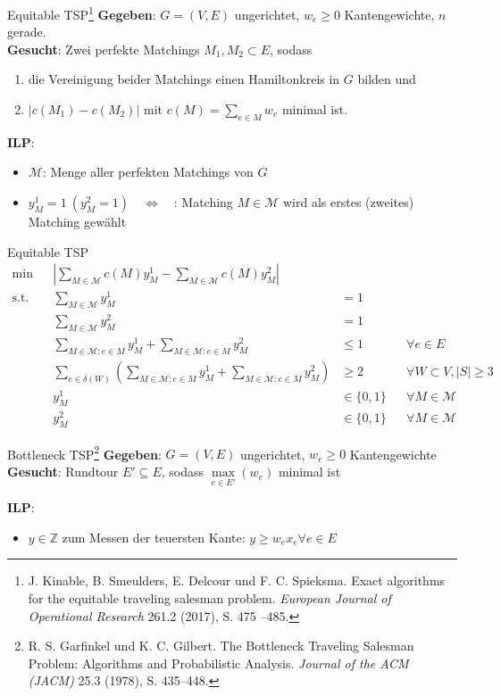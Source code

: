 \documentclass[ngerman,aspectratio=169,10pt]{beamer}
\begin{document}
\begin{frame}{Equitable TSP\footnote{J. Kinable, B. Smeulders, E. Delcour und F. C. Spieksma. Exact algorithms for the equitable traveling salesman problem. \emph{European Journal of Operational Research} 261.2 (2017), S. 475 –485.}}
	\textbf{Gegeben}: $G=(V,E)$ ungerichtet, $w_e\geq0$ Kantengewichte, $n$ gerade.\\
	\textbf{Gesucht}: Zwei perfekte Matchings $M_1,M_2\subset E$, sodass
	\begin{enumerate}
		\item die Vereinigung beider Matchings einen Hamiltonkreis in $G$ bilden und
		\item $|c(M_1)-c(M_2)|$ mit $c(M)=\sum_{e\in M}w_e$ minimal ist.
	\end{enumerate}

	\textbf{ILP}:
	\begin{itemize}
		\item $\mathcal{M}$: Menge aller perfekten Matchings von $G$
		\item $y_M^1=1~(y_M^2=1)\quad\Leftrightarrow\quad$: Matching $M\in\mathcal{M}$ wird als erstes (zweites) Matching gewählt
	\end{itemize}

	
\end{frame}
\begin{frame}{Equitable TSP}
   \begin{align*}
   \min    && \left|\sum_{M\in\mathcal{M}}c(M)y_M^1-\sum_{M\in\mathcal{M}}c(M)y_M^2\right|\\
   \text{s.t.} && \sum_{M\in\mathcal{M}}y_M^1 &=1&&\\
   && \sum_{M\in\mathcal{M}}y_M^2 &=1&&\\
   && \sum_{M\in\mathcal{M}:e\in M}y_M^1+\sum_{M\in\mathcal{M}:e\in M}y_M^2 &\leq1 &&\forall e\in E\\
   && \sum_{e\in\delta(W)}\left(\sum_{M\in\mathcal{M}:e\in M}y_M^1+\sum_{M\in\mathcal{M}:e\in M}y_M^2\right) &\geq 2 &&\forall W\subset V, |S| \geq 3\\
   && y_M^1 &\in\{0,1\} &&\forall M\in\mathcal{M}\\
   && y_M^2 &\in\{0,1\} &&\forall M\in\mathcal{M}
   \end{align*}
\end{frame}

\begin{frame}{Bottleneck TSP\footnote{R. S. Garfinkel und K. C. Gilbert. The Bottleneck Traveling Salesman Problem: Algorithms and Probabilistic Analysis. \emph{Journal of the ACM (JACM)} 25.3 (1978), S. 435–448.}}
	\textbf{Gegeben}: $G=(V,E)$ ungerichtet, $w_e\geq0$ Kantengewichte\\
	\textbf{Gesucht}: Rundtour $E'\subseteq E$, sodass $\max\limits_{e\in E'}(w_e)$ minimal ist

	\textbf{ILP}:
	\begin{itemize}
		\item $y\in\mathbb{Z}$ zum Messen der teuersten Kante: $y\geq w_e x_e \forall e\in E$
	\end{itemize}
\end{frame}
\end{document}

